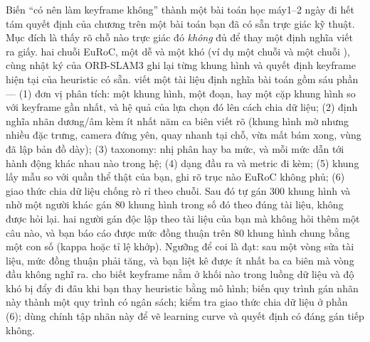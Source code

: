 \documentclass[../../deep_learning.tex]{subfiles}
\begin{document}
\begin{duan}{Biến ``có nên làm keyframe không'' thành một bài toán học máy}{1--2 ngày}
\dmt đi hết tám quyết định của chương trên một bài toán bạn đã có sẵn trực giác kỹ thuật. Mục đích là thấy rõ chỗ nào trực giác đó \emph{không} đủ để thay một định nghĩa viết ra giấy.
\ddl hai chuỗi EuRoC, một dễ và một khó (ví dụ một chuỗi  và một chuỗi ), cùng nhật ký của ORB-SLAM3 ghi lại từng khung hình và quyết định keyframe hiện tại của heuristic có sẵn.
\dbc viết một tài liệu định nghĩa bài toán gồm sáu phần --- (1) đơn vị phân tích: một khung hình, một đoạn, hay một cặp khung hình so với keyframe gần nhất, và hệ quả của lựa chọn đó lên cách chia dữ liệu; (2) định nghĩa nhãn dương/âm kèm ít nhất năm ca biên viết rõ (khung hình mờ nhưng nhiều đặc trưng, camera đứng yên, quay nhanh tại chỗ, vừa mất bám xong, vùng đã lập bản đồ dày); (3) taxonomy: nhị phân hay ba mức, và mỗi mức dẫn tới hành động khác nhau nào trong hệ; (4) dạng đầu ra và metric đi kèm; (5) khung lấy mẫu so với quần thể thật của bạn, ghi rõ trục nào EuRoC không phủ; (6) giao thức chia dữ liệu chống rò rỉ theo chuỗi. Sau đó tự gán \(300\) khung hình và nhờ một người khác gán \(80\) khung hình trong số đó theo đúng tài liệu, không được hỏi lại.
\dxk hai người gán độc lập theo tài liệu của bạn mà không hỏi thêm một câu nào, và bạn báo cáo được mức đồng thuận trên \(80\) khung hình chung bằng một con số (kappa hoặc tỉ lệ khớp). Ngưỡng để coi là đạt: sau một vòng sửa tài liệu, mức đồng thuận phải tăng, và bạn liệt kê được ít nhất ba ca biên mà vòng đầu không nghĩ ra.
\dnv {} cho biết keyframe nằm ở khối nào trong luồng dữ liệu và độ khó bị đẩy đi đâu khi bạn thay heuristic bằng mô hình;  biến quy trình gán nhãn này thành một quy trình có ngân sách;  kiểm tra giao thức chia dữ liệu ở phần (6);  dùng chính tập nhãn này để vẽ learning curve và quyết định có đáng gán tiếp không.
\end{duan}

\begin{traloi}
\end{traloi}
\end{document}
